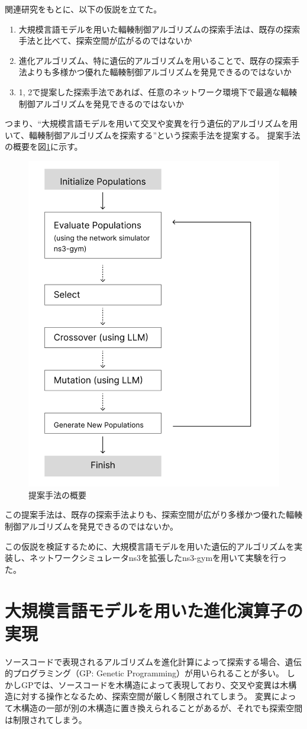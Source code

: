 \documentclass[a4paper,11pt]{jreport}
\newcommand{\figref}[1]{図\ref{#1}}
\begin{document}
関連研究をもとに、以下の仮説を立てた。
\begin{enumerate}
  \item 大規模言語モデルを用いた輻輳制御アルゴリズムの探索手法は、既存の探索手法と比べて、探索空間が広がるのではないか
  \item 進化アルゴリズム、特に遺伝的アルゴリズムを用いることで、既存の探索手法よりも多様かつ優れた輻輳制御アルゴリズムを発見できるのではないか
  \item 1, 2で提案した探索手法であれば、任意のネットワーク環境下で最適な輻輳制御アルゴリズムを発見できるのではないか
\end{enumerate}
つまり、``大規模言語モデルを用いて交叉や変異を行う遺伝的アルゴリズムを用いて、輻輳制御アルゴリズムを探索する''という探索手法を提案する。
提案手法の概要を\figref{figure:proposed_flow}に示す。
\begin{figure}[htbp]
  \centering
  \includegraphics[width=0.4\linewidth]{fig/chap03/proposed_flow.png}
  \caption{提案手法の概要}
  \label{figure:proposed_flow}
\end{figure}
この提案手法は、既存の探索手法よりも、探索空間が広がり多様かつ優れた輻輳制御アルゴリズムを発見できるのではないか。

この仮説を検証するために、大規模言語モデルを用いた遺伝的アルゴリズムを実装し、ネットワークシミュレータns3\cite{ns3-2012, ns3-2010}を拡張したns3-gym\cite{ns3gym}を用いて実験を行った。

\section{大規模言語モデルを用いた進化演算子の実現}

ソースコードで表現されるアルゴリズムを進化計算によって探索する場合、遺伝的プログラミング（GP: Genetic Programming）が用いられることが多い。
しかしGPでは、ソースコードを木構造によって表現しており、交叉や変異は木構造に対する操作となるため、探索空間が厳しく制限されてしまう。
変異によって木構造の一部が別の木構造に置き換えられることがあるが、それでも探索空間は制限されてしまう。
\end{document}
